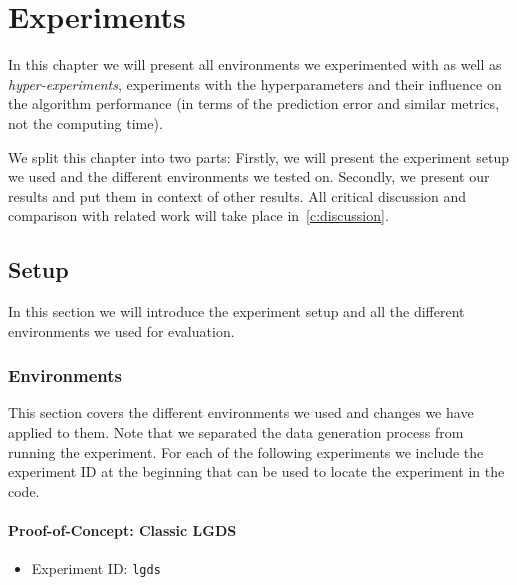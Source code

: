 \chapter{Experiments}
\label{c:experiments}



In this chapter we will present all environments we experimented with as well as \emph{hyper-experiments}, \ie experiments with the hyperparameters and their influence on the algorithm performance (in terms of the prediction error and similar metrics, not the computing time).

We split this chapter into two parts: Firstly, we will present the experiment setup we used and the different environments we tested on. Secondly, we present our results and put them in context of other results. All critical discussion and comparison with related work will take place in~\autoref{c:discussion}.

\section{Setup}
	In this section we will introduce the experiment setup and all the different environments we used for evaluation.

	\subsection{Environments}
		This section covers the different environments we used and changes we have applied to them. Note that we separated the data generation process from running the experiment. For each of the following experiments we include the experiment ID at the beginning that can be used to locate the experiment in the code.

		\subsubsection{Proof-of-Concept: Classic LGDS}
			\begin{itemize}
				\item Experiment ID: \texttt{lgds}
			\end{itemize}

